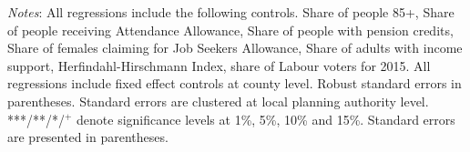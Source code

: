 \documentclass[12pt,letterpaper]{article}
\begin{document}
\begin{table}[h]
\centering
\caption{First stage results, dependent variable house prices (log)}
\label{table first_stage}
\begin{tablenotes}
      \scriptsize
      \item {\it{Notes}}: All regressions include the following controls. Share of people 85+, 
      Share of people receiving Attendance Allowance, Share of people with pension credits, 
      Share of females claiming for Job Seekers Allowance, Share of adults with income 
      support, 
      Herfindahl-Hirschmann Index, share of Labour voters for 2015. All regressions include fixed effect controls at
      county level. Robust standard errors in parentheses. Standard errors are clustered at local planning 
      authority level. ***/**/*/$^{+}$ denote significance levels at 1\%, 5\%, 
      10\% and 15\%. Standard errors are presented in parentheses. 
    \end{tablenotes}
\end{table}


\newpage


%
\newpage
\end{document}
